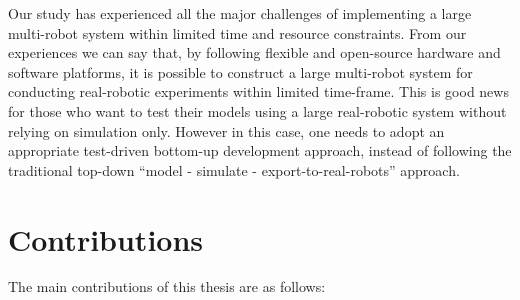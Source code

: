 Our study has experienced all the major challenges of implementing a large multi-robot system within limited time and resource constraints. From our experiences we can say that, by following flexible and open-source hardware and software platforms, it is possible to construct a large multi-robot system for conducting real-robotic experiments within limited time-frame. This is good news for those who want to test their models using a large real-robotic system without relying on simulation only. However in this case, one needs to adopt an appropriate test-driven bottom-up development approach, instead of following the traditional top-down ``model - simulate -  export-to-real-robots'' approach. 
\section{Contributions}
The main contributions of this thesis are as follows:
